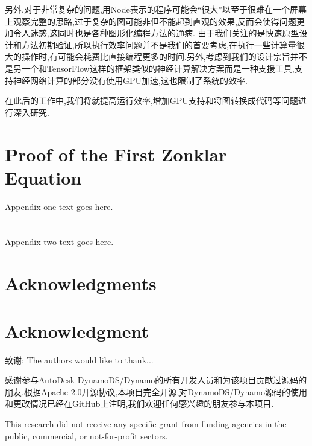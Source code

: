 \documentclass[10pt,journal,compsoc,UTF8]{IEEEtran}
\begin{document}
另外,对于非常复杂的问题,用Node表示的程序可能会“很大”以至于很难在一个屏幕上观察完整的思路,过于复杂的图可能非但不能起到直观的效果,反而会使得问题更加令人迷惑,这同时也是各种图形化编程方法的通病.
由于我们关注的是快速原型设计和方法初期验证,所以执行效率问题并不是我们的首要考虑,在执行一些计算量很大的操作时,有可能会耗费比直接编程更多的时间.另外,考虑到我们的设计宗旨并不是另一个和TensorFlow这样的框架类似的神经计算解决方案而是一种支援工具,支持神经网络计算的部分没有使用GPU加速,这也限制了系统的效率.

在此后的工作中,我们将就提高运行效率,增加GPU支持和将图转换成代码等问题进行深入研究.


\appendices
\section{Proof of the First Zonklar Equation}
Appendix one text goes here.

\section{}
Appendix two text goes here.


\ifCLASSOPTIONcompsoc
  \section*{Acknowledgments}
\else
  \section*{Acknowledgment}
\fi
致谢:
The authors would like to thank...

感谢参与AutoDesk DynamoDS/Dynamo的所有开发人员和为该项目贡献过源码的朋友,根据Apache 2.0开源协议,本项目完全开源,对DynamoDS/Dynamo源码的使用和更改情况已经在GitHub上注明,我们欢迎任何感兴趣的朋友参与本项目.

This research did not receive any specific grant from funding agencies in the public, commercial, or not-for-profit sectors.



\ifCLASSOPTIONcaptionsoff
  \newpage
\fi

\end{document}
